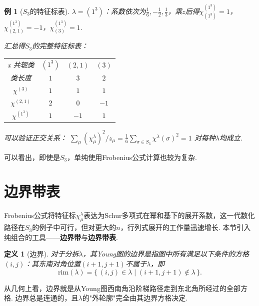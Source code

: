 \documentclass{sjtureport}
\newtheorem{definition}{定义}[chapter]
\newtheorem{example}{例}[chapter]
\renewcommand{\arraystretch}{1}
\begin{document}
\begin{example}[$S_3$的特征标表]
\medskip
\noindent$\lambda=(1^3)$：系数依次为$\frac{1}{6},-\frac{1}{2},\frac{1}{3}$，乘$z$后得$\chi^{(1^3)}_{(1^3)}=1$，$\chi^{(1^3)}_{(2,1)}=-1$，$\chi^{(1^3)}_{(3)}=1$. 

\medskip
汇总得$S_3$的完整特征标表：
\begin{center}
\renewcommand{\arraystretch}{1.3}
\begin{tabular}{c|ccc}x
    共轭类    & $(1^3)$ & $(2,1)$ & $(3)$ \\
    类长度    & $1$  & $3$  & $2$  \\
    \hline
    $\chi^{(3)}$   & $1$  & $1$  & $1$  \rule{0pt}{13pt}\\
    $\chi^{(2,1)}$ & $2$  & $0$  & $-1$ \rule{0pt}{13pt}\\
    $\chi^{(1^3)}$ & $1$  & $-1$ & $1$  \\
    \hline
\end{tabular}
\end{center}

可以验证正交关系：
$\sum_{\mu}(\chi^\lambda_\mu)^2/z_\mu
=\frac{1}{6}\sum_{\sigma\in S_3}\chi^\lambda(\sigma)^2=1$
对每种$\lambda$均成立. 
\end{example}

可以看出，即使是$S_3$，单纯使用Frobenius公式计算也较为复杂.


\section{边界带表}

Frobenius公式将特征标$\chi^\lambda_\mu$表达为Schur多项式在幂和基下的展开系数，这一代数化路径在$S_3$的例子中可行，但对更大的$n$，行列式展开的工作量迅速增长. 本节引入纯组合的工具——\textbf{边界带}与\textbf{边界带表}.


\begin{definition}[边界]
    对于分拆$\lambda$，其Young图的\emph{边界}是指图中所有满足以下条件的方格$(i,j)$：其东南对角位置$(i+1,j+1)$不属于$\lambda$，即
\begin{equation*}
    \mathrm{rim}(\lambda) = \{\, (i,j) \in \lambda \mid (i+1,j+1) \notin \lambda \,\}.
\end{equation*}
\end{definition}

从几何上看，边界就是从Young图西南角沿阶梯路径走到东北角所经过的全部方格. 边界总是连通的，且$\lambda$的"外轮廓"完全由其边界方格决定. 
\end{document}
